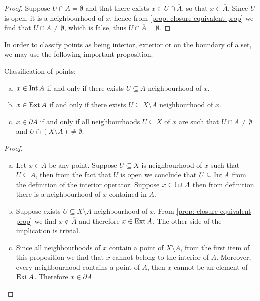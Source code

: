\begin{proof}
Suppose \(U \cap A = \emptyset\) and that there exists \(x \in U \cap
\overline A\), so that \(x \in \overline A\). Since \(U\) is open, it
is a neighbourhood of \(x\), hence from \cref{prop: closure equivalent prop}
we find that \(U \cap A \neq \emptyset\), which is false, thus \(U \cap
\overline A = \emptyset\).
\end{proof}

In order to classify points as being interior, exterior or on the boundary of a
set, we may use the following important proposition.

\begin{proposition}
\label{prop:classification-int-ext-boundary-points}
Classification of points:
\begin{enumerate}[(a)]\setlength\itemsep{0em}
\item \(x \in \operatorname{Int} A\) if and only if there exists \(U \subseteq A\)
  neighbourhood of \(x\).

\item \(x \in \operatorname{Ext} A\) if and only if there exists \(U \subseteq X \setminus A\)
  neighbourhood of \(x\).

\item \(x \in \partial A\) if and only if all neighbourhoods \(U \subseteq X\)
  of \(x\) are such that \(U \cap A \neq \emptyset\) and \(U \cap (X \setminus
  A) \neq \emptyset\).
\end{enumerate}
\end{proposition}

\begin{proof}
\begin{enumerate}[(a)]\setlength\itemsep{0em}
\item Let \(x \in A\) be any point. Suppose \(U \subseteq X\) is neighbourhood
  of \(x\) such that \(U \subseteq A\), then from the fact that \(U\) is open we
  conclude that \(U \subseteq \operatorname{Int} A\) from the definition of the interior
  operator. Suppose \(x \in \operatorname{Int} A\) then from definition there is a
  neighbourhood of \(x\) contained in \(A\).

\item Suppose exists \(U \subseteq X \setminus A\) neighbourhood of \(x\). From
  \cref{prop: closure equivalent prop} we find \(x \notin \overline{A}\) and
  therefore \(x \in \operatorname{Ext} A\). The other side of the implication is trivial.

\item Since all neighbourhoods of \(x\) contain a point of \(X \setminus A\),
  from the first item of this proposition we find that \(x\) cannot belong to
  the interior of \(A\). Moreover, every neighbourhood contains a point of
  \(A\), then \(x\) cannot be an element of \(\operatorname{Ext} A\). Therefore \(x \in
  \partial A\).
\end{enumerate}
\end{proof}

